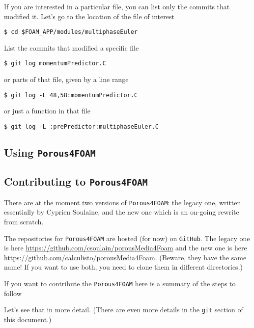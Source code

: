 \documentclass[a4paper]{article}
\newcommand{\PF}{\texttt{Porous4FOAM}\xspace}
\newcommand{\GIT}{\texttt{git}\xspace}
\newcommand{\GH}{\texttt{GitHub}\xspace}
\begin{document}
If you are interested in a particular file, you can list only the commits that
modified it. Let's go to the location of the file of interest
\begin{verbatim}
$ cd $FOAM_APP/modules/multiphaseEuler
\end{verbatim}
List the commits that modified a specific file
\begin{verbatim}
$ git log momentumPredictor.C
\end{verbatim}
or parts of that file, given by a line range
\begin{verbatim}
$ git log -L 48,58:momentumPredictor.C
\end{verbatim}
or just a function in that file
\begin{verbatim}
$ git log -L :prePredictor:multiphaseEuler.C
\end{verbatim}

\subsection{Using \PF}

\subsection{Contributing to \PF}

There are at the moment two versions of \PF: the legacy one, written essentially
by Cyprien Soulaine, and the new one which is an on-going rewrite from scratch.

The repositories for \PF are hosted (for now) on \GH. The legacy one is here 
\url{https://github.com/csoulain/porousMedia4Foam} and the new one is here
\url{https://github.com/calculisto/porousMedia4Foam}. (Beware, they have the
same name! If you want to use both, you need to clone them in different
directories.)

If you want to contribute the \PF here is a summary of the steps to follow
Let's see that in more detail. (There are even more details in the \GIT section
of this document.)
\end{document}
